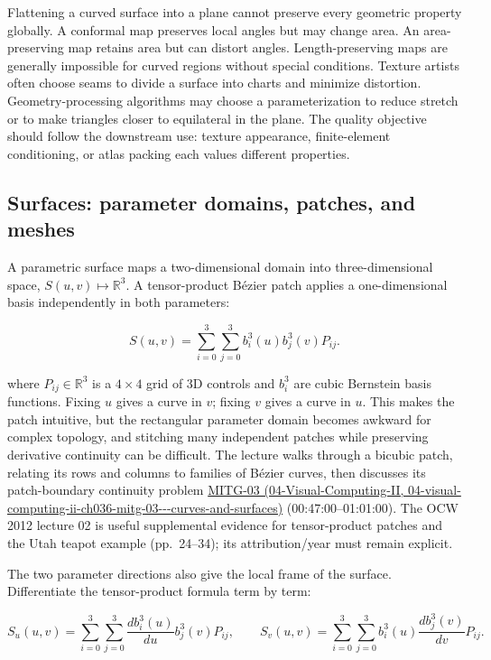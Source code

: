 Flattening a curved surface into a plane cannot preserve every geometric property globally. A conformal map preserves local angles but may change area. An area-preserving map retains area but can distort angles. Length-preserving maps are generally impossible for curved regions without special conditions. Texture artists often choose seams to divide a surface into charts and minimize distortion. Geometry-processing algorithms may choose a parameterization to reduce stretch or to make triangles closer to equilateral in the plane. The quality objective should follow the downstream use: texture appearance, finite-element conditioning, or atlas packing each values different properties.

\subsection{Surfaces: parameter domains, patches, and meshes}\label{03-visual-computing-i-ch002-surfaces-parameter-domains-patches-and-meshes}

A parametric surface maps a two-dimensional domain into three-dimensional space, \(S(u,v)\mapsto\mathbb R^3\). A tensor-product Bézier patch applies a one-dimensional basis independently in both parameters:

\[
S(u,v)=\sum_{i=0}^{3}\sum_{j=0}^{3} b_i^3(u)b_j^3(v)P_{ij}.
\]

where \(P_{ij}\in\mathbb{R}^3\) is a \(4\times4\) grid of 3D controls and \(b_i^3\) are cubic Bernstein basis functions. Fixing \(u\) gives a curve in \(v\); fixing \(v\) gives a curve in \(u\). This makes the patch intuitive, but the rectangular parameter domain becomes awkward for complex topology, and stitching many independent patches while preserving derivative continuity can be difficult. The lecture walks through a bicubic patch, relating its rows and columns to families of Bézier curves, then discusses its patch-boundary continuity problem \href{../04-Visual-Computing-II/main.pdf\#nameddest=04-visual-computing-ii-ch036-mitg-03---curves-and-surfaces}{MITG-03 (04-Visual-Computing-II, 04-visual-computing-ii-ch036-mitg-03-\/-\/-curves-and-surfaces)} (00:47:00--01:01:00). The OCW 2012 lecture 02 is useful supplemental evidence for tensor-product patches and the Utah teapot example (pp.~24--34); its attribution/year must remain explicit.

The two parameter directions also give the local frame of the surface. Differentiate the tensor-product formula term by term:

\[
S_u(u,v)=\sum_{i=0}^{3}\sum_{j=0}^{3}\frac{d b_i^3(u)}{du}b_j^3(v)P_{ij},\qquad
S_v(u,v)=\sum_{i=0}^{3}\sum_{j=0}^{3}b_i^3(u)\frac{d b_j^3(v)}{dv}P_{ij}.
\]

